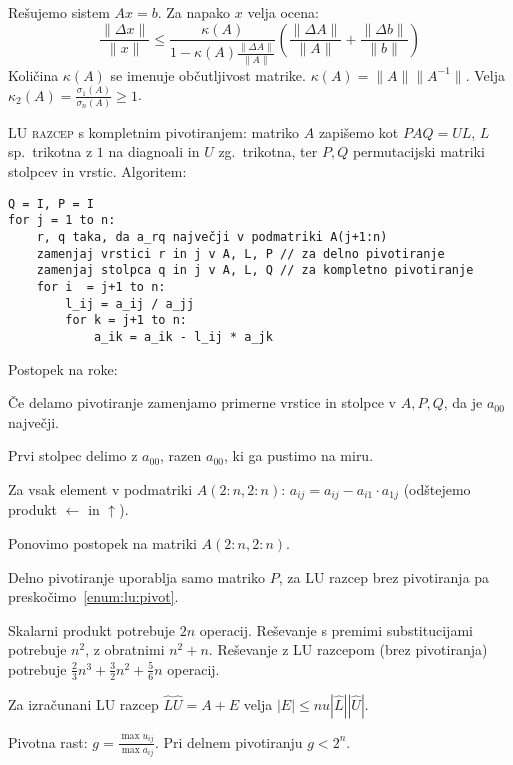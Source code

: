 \documentclass[a4paper,10pt]{article}
\theoremstyle{definition}
\newenvironment{enumerate*}%
{
\vspace{-6pt}
\begin{enumerate}
\setlength{\itemsep}{0pt}
\setlength{\parskip}{2pt}
}
{\end{enumerate}}
\begin{document}
Rešujemo sistem $Ax=b$. Za napako $x$ velja ocena:
\[ \frac{\|\Delta x\|}{\|x\|}  \leq \frac{\kappa(A)}{1-\kappa(A) \frac{\|\Delta
A\|}{\|A\|}} \left( \frac{\|\Delta A\|}{\|A\|} + \frac{\|\Delta
b\|}{\|b\|}\right) \]
Količina $\kappa(A)$ se imenuje občutljivost matrike. $\kappa(A) =
\|A\|\|A^{-1}\|$. Velja $\kappa_2(A) = \frac{\sigma_1(A)}{\sigma_n(A)} \geq 1$.

\textsc{LU razcep} s kompletnim pivotiranjem: matriko $A$ zapišemo kot $PAQ =
UL$, $L$ sp.\ trikotna z $1$ na diagnoali in $U$ zg.\ trikotna, ter $P, Q$
permutacijski matriki stolpcev in vrstic. Algoritem:
\scriptsize
\begin{verbatim}
Q = I, P = I
for j = 1 to n:
    r, q taka, da a_rq največji v podmatriki A(j+1:n)
    zamenjaj vrstici r in j v A, L, P // za delno pivotiranje
    zamenjaj stolpca q in j v A, L, Q // za kompletno pivotiranje
    for i  = j+1 to n:
        l_ij = a_ij / a_jj
        for k = j+1 to n:
            a_ik = a_ik - l_ij * a_jk
\end{verbatim}
\normalsize

Postopek na roke:
\begin{enumerate*}
  \item * Če delamo pivotiranje zamenjamo primerne vrstice in stolpce v
    $A, P, Q$, da je $a_{00}$ največji. \label{enum:lu:pivot}
  \item Prvi stolpec delimo z $a_{00}$, razen $a_{00}$, ki ga pustimo na miru.
  \item Za vsak element v podmatriki $A(2:n, 2:n)$: $a_{ij} = a_{ij} - a_{i1} \cdot
    a_{1j}$ (odštejemo produkt  $\leftarrow$ in $\uparrow$).
  \item Ponovimo postopek na matriki $A(2:n, 2:n)$.
\end{enumerate*}

Delno pivotiranje uporablja samo matriko $P$, za LU razcep brez pivotiranja pa
preskočimo~\ref{enum:lu:pivot}.

Skalarni produkt potrebuje $2n$ operacij. Reševanje s premimi substitucijami
potrebuje $n^2$, z obratnimi $n^2+n$. Reševanje z LU razcepom (brez pivotiranja) potrebuje
$\frac23n^3 + \frac32n^2 + \frac56n$ operacij.

Za izračunani LU razcep $\hat{L}\hat{U} = A + E$ velja $|E| \leq
nu|\hat{L}||\hat{U}|$.

Pivotna rast: $g = \frac{\max u_{ij}}{\max a_{ij}}$. Pri delnem pivotiranju $g < 2^n$.
\end{document}
